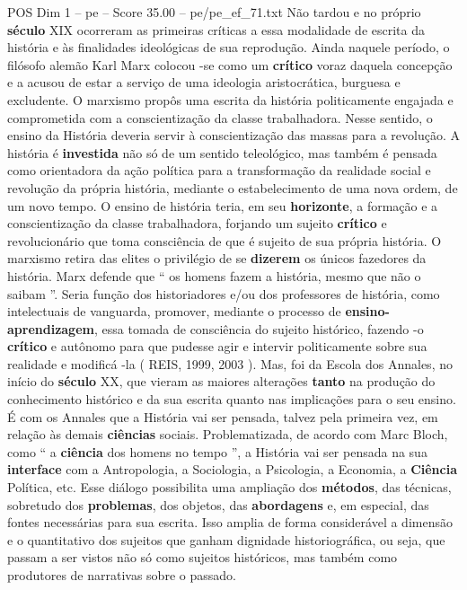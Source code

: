 \begin{textsample}{POS Dim 1 – pe – Score 35.00 – pe/pe\_ef\_71.txt}
Não tardou e no próprio \textbf{século} XIX ocorreram as primeiras críticas a essa modalidade de escrita da história e às finalidades ideológicas de sua reprodução.
Ainda naquele período, o filósofo alemão Karl Marx colocou -se como um \textbf{crítico} voraz daquela concepção e a acusou de estar a serviço de uma ideologia aristocrática, burguesa e excludente.
O marxismo propôs uma escrita da história politicamente engajada e comprometida com a conscientização da classe trabalhadora.
Nesse sentido, o ensino da História deveria servir à conscientização das massas para a revolução.
A história é \textbf{investida} não só de um sentido teleológico, mas também é pensada como orientadora da ação política para a transformação da realidade social e revolução da própria história, mediante o estabelecimento de uma nova ordem, de um novo tempo.
O ensino de história teria, em seu \textbf{horizonte}, a formação e a conscientização da classe trabalhadora, forjando um sujeito \textbf{crítico} e revolucionário que toma consciência de que é sujeito de sua própria história.
O marxismo retira das elites o privilégio de se \textbf{dizerem} os únicos fazedores da história.
Marx defende que “ os homens fazem a história, mesmo que não o saibam ”.
Seria função dos historiadores e/ou dos professores de história, como intelectuais de vanguarda, promover, mediante o processo de \textbf{ensino-aprendizagem}, essa tomada de consciência do sujeito histórico, fazendo -o \textbf{crítico} e autônomo para que pudesse agir e intervir politicamente sobre sua realidade e modificá -la ( REIS, 1999, 2003 ).
Mas, foi da Escola dos Annales, no início do \textbf{século} XX, que vieram as maiores alterações \textbf{tanto} na produção do conhecimento histórico e da sua escrita quanto nas implicações para o seu ensino.
É com os Annales que a História vai ser pensada, talvez pela primeira vez, em relação às demais \textbf{ciências} sociais.
Problematizada, de acordo com Marc Bloch, como “ a \textbf{ciência} dos homens no tempo ”, a História vai ser pensada na sua \textbf{interface} com a Antropologia, a Sociologia, a Psicologia, a Economia, a \textbf{Ciência} Política, etc.
Esse diálogo possibilita uma ampliação dos \textbf{métodos}, das técnicas, sobretudo dos \textbf{problemas}, dos objetos, das \textbf{abordagens} e, em especial, das fontes necessárias para sua escrita.
Isso amplia de forma considerável a dimensão e o quantitativo dos sujeitos que ganham dignidade historiográfica, ou seja, que passam a ser vistos não só como sujeitos históricos, mas também como produtores de narrativas sobre o passado.

\end{textsample}
